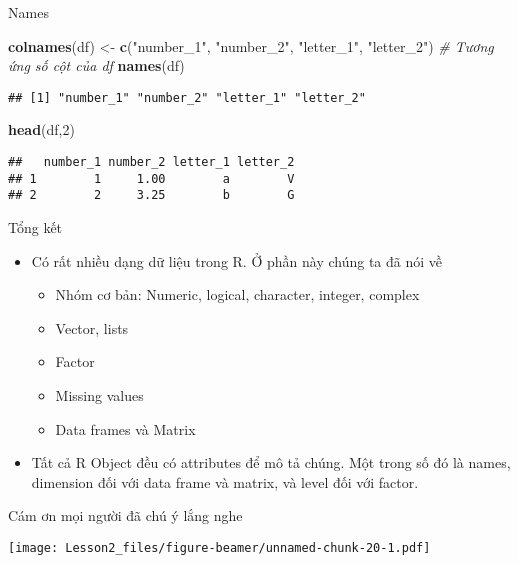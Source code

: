 \documentclass[
  ignorenonframetext,
]{beamer}
\newenvironment{Shaded}{}{}
\newcommand{\CommentTok}[1]{\textcolor[rgb]{0.38,0.63,0.69}{\textit{#1}}}
\newcommand{\DecValTok}[1]{\textcolor[rgb]{0.25,0.63,0.44}{#1}}
\newcommand{\KeywordTok}[1]{\textcolor[rgb]{0.00,0.44,0.13}{\textbf{#1}}}
\newcommand{\NormalTok}[1]{#1}
\newcommand{\StringTok}[1]{\textcolor[rgb]{0.25,0.44,0.63}{#1}}
\providecommand{\tightlist}{%
  \setlength{\itemsep}{0pt}\setlength{\parskip}{0pt}}
\begin{document}
\begin{frame}[fragile]{Names}
\protect\hypertarget{names-8}{}

\begin{Shaded}
\begin{Highlighting}[]
\KeywordTok{colnames}\NormalTok{(df) <-}\StringTok{ }\KeywordTok{c}\NormalTok{(}\StringTok{"number_1"}\NormalTok{,}
                  \StringTok{"number_2"}\NormalTok{,}
                  \StringTok{"letter_1"}\NormalTok{,}
                  \StringTok{"letter_2"}\NormalTok{) }\CommentTok{# Tương ứng số cột của df}
\KeywordTok{names}\NormalTok{(df)}
\end{Highlighting}
\end{Shaded}

\begin{verbatim}
## [1] "number_1" "number_2" "letter_1" "letter_2"
\end{verbatim}

\begin{Shaded}
\begin{Highlighting}[]
\KeywordTok{head}\NormalTok{(df,}\DecValTok{2}\NormalTok{)}
\end{Highlighting}
\end{Shaded}

\begin{verbatim}
##   number_1 number_2 letter_1 letter_2
## 1        1     1.00        a        V
## 2        2     3.25        b        G
\end{verbatim}

\end{frame}

\begin{frame}{Tổng kết}
\protect\hypertarget{tux1ed5ng-kux1ebft}{}

\begin{itemize}[<+->]
\item
  Có rất nhiều dạng dữ liệu trong R. Ở phần này chúng ta đã nói về

  \begin{itemize}[<+->]
  \tightlist
  \item
    Nhóm cơ bản: Numeric, logical, character, integer, complex
  \item
    Vector, lists
  \item
    Factor
  \item
    Missing values
  \item
    Data frames và Matrix
  \end{itemize}
\item
  Tất cả R Object đều có attributes để mô tả chúng. Một trong số đó là
  names, dimension đối với data frame và matrix, và level đối với
  factor.
\end{itemize}

\end{frame}

\begin{frame}{Cám ơn mọi người đã chú ý lắng nghe}
\protect\hypertarget{cuxe1m-ux1a1n-mux1ecdi-ngux1b0ux1eddi-ux111uxe3-chuxfa-uxfd-lux1eafng-nghe}{}

\texttt{[image: Lesson2\_files/figure-beamer/unnamed-chunk-20-1.pdf]}

\end{frame}
\end{document}
